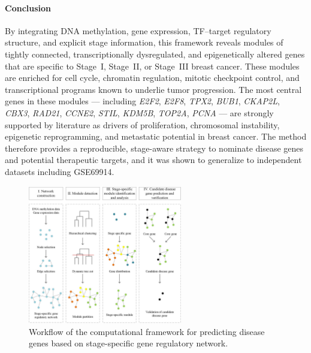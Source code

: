\documentclass[10pt]{extarticle}
\begin{document}
\paragraph{Conclusion}
By integrating DNA methylation, gene expression, TF--target regulatory structure, and explicit stage information, this framework reveals modules of tightly connected, transcriptionally dysregulated, and epigenetically altered genes that are specific to Stage~I, Stage~II, or Stage~III breast cancer. These modules are enriched for cell cycle, chromatin regulation, mitotic checkpoint control, and transcriptional programs known to underlie tumor progression. The most central genes in these modules --- including \textit{E2F2}, \textit{E2F8}, \textit{TPX2}, \textit{BUB1}, \textit{CKAP2L}, \textit{CBX3}, \textit{RAD21}, \textit{CCNE2}, \textit{STIL}, \textit{KDM5B}, \textit{TOP2A}, \textit{PCNA} --- are strongly supported by literature as drivers of proliferation, chromosomal instability, epigenetic reprogramming, and metastatic potential in breast cancer. The method therefore provides a reproducible, stage-aware strategy to nominate disease genes and potential therapeutic targets, and it was shown to generalize to independent datasets including GSE69914.

\begin{figure}[H]
    \centering
    \includegraphics[width=0.6\textwidth]{Figures/Workflow of the computational framework for predicting disease genes based on stage-specific gene regulatory network.jpg} %
    \caption{Workflow of the computational framework for predicting disease genes based on stage-specific gene regulatory network.}
    \label{fig:Workflow}
\end{figure}


\printbibliography
\end{document}
